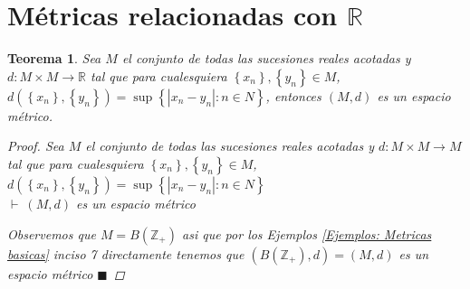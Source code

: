 \documentclass[oneside]{book} %
\theoremstyle{Teorema}
\newtheorem{Teorema}[Definicion]{Teorema}
\theoremstyle{Ejemplos}
\theoremstyle{[Obs]}
\newcommand{\abs}[1]{\left|#1\right|} %
\renewcommand{\{}{\left\lbrace} %
\renewcommand{\}}{\right\rbrace} %
\newcommand{\R}{\mathbb{R}} %
\newcommand{\Z}{\mathbb{Z}} %
\renewcommand{\qed}{$\blacksquare$} %
\newcommand{\pd}{$\vdash\ $} %
\begin{document}
		\section{Métricas relacionadas con $\R$}

			\begin{Teorema}\setlength{\parindent}{0em}
				
				Sea $M$ el conjunto de todas las sucesiones reales acotadas y $d : M \times M \to \R$ tal que para cualesquiera $\{ x_n \}, \{ y_n \} \in M$, $d(\{ x_n \}, \{ y_n \}) = \sup\{ \abs{ x_n - y_n} : n \in N \}$, entonces $(M, d)$ es un espacio métrico.

				\begin{proof}
					
					Sea $M$ el conjunto de todas las sucesiones reales acotadas y $d : M \times M \to M$ tal que para cualesquiera $\{ x_n \}, \{ y_n \} \in M$, $d(\{ x_n \}, \{ y_n \}) = \sup\{ \abs{x_n - y_n} : n \in N \}$ \\
					\pd $(M, d)$ es un espacio métrico

					Observemos que $M = B(\Z_{+})$ asi que por los Ejemplos \ref{Ejemplos: Metricas basicas} inciso 7 directamente tenemos que $(B(\Z_{+}), d) = (M, d)$ es un espacio métrico \qed

				\end{proof}

			\end{Teorema}
\end{document}

